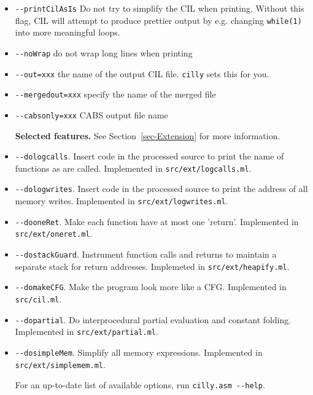 \documentclass[letterpaper]{article}
\def\secref#1{Section~\ref{sec-#1}}
\def\t#1{{\tt #1}}
\begin{document}
\begin{itemize}
  {\bf Output Options:}
  \item \t{-{}-printCilAsIs} Do not try to simplify the CIL when
  printing.  Without this flag, CIL will attempt to produce prettier
  output by e.g. changing \t{while(1)} into more meaningful loops.
  \item \t{-{}-noWrap} do not wrap long lines when printing
  \item \t{-{}-out=xxx} the name of the output CIL file.  \t{cilly}
  sets this for you.
  \item \t{-{}-mergedout=xxx} specify the name of the merged file
  \item \t{-{}-cabsonly=xxx} CABS output file name

  {\bf Selected features.}  See \secref{Extension} for more information.
\item \t{-{}-dologcalls}. Insert code in the processed source to print the name of
functions as are called. Implemented in \t{src/ext/logcalls.ml}.
\item \t{-{}-dologwrites}. Insert code in the processed source to print the
address of all memory writes. Implemented in \t{src/ext/logwrites.ml}.
\item \t{-{}-dooneRet}. Make each function have at most one 'return'.
Implemented in \t{src/ext/oneret.ml}. 
\item \t{-{}-dostackGuard}. Instrument function calls and returns to
maintain a separate stack for return addresses. Implemeted in
\t{src/ext/heapify.ml}. 
\item \t{-{}-domakeCFG}. Make the program look more like a CFG. Implemented
in \t{src/cil.ml}. 
\item \t{-{}-dopartial}. Do interprocedural partial evaluation and
constant folding. Implemented in \t{src/ext/partial.ml}. 
\item \t{-{}-dosimpleMem}. Simplify all memory expressions. Implemented in
\t{src/ext/simplemem.ml}. 

For an up-to-date list of available options, run \t{cilly.asm -{}-help}. 

\end{itemize}
\end{document}
